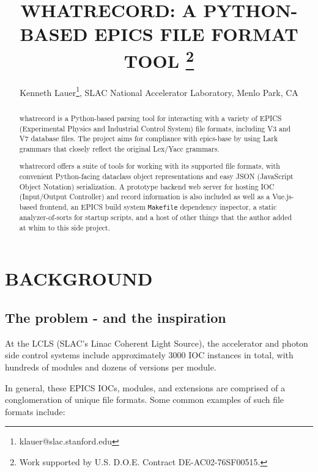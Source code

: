 \documentclass[letter,
               keeplastbox,   %
               ]{jacow}
\begin{document}
\title{WHATRECORD: A PYTHON-BASED EPICS FILE FORMAT TOOL
\thanks{Work supported by U.S. D.O.E. Contract DE-AC02-76SF00515.}}
\author{Kenneth Lauer\thanks{klauer@slac.stanford.edu}, SLAC National Accelerator Laboratory, Menlo Park, CA }
	
\maketitle

%
\begin{abstract}
  whatrecord\cite{whatrecord-github} is a Python-based parsing tool for
  interacting with a variety of EPICS (Experimental Physics and Industrial
  Control System) file formats, including V3 and V7 database files. The project
  aims for compliance with epics-base by using Lark\cite{lark} grammars that
  closely reflect the original Lex/Yacc grammars. 

  whatrecord offers a suite of tools for working with its supported file
  formats, with convenient Python-facing dataclass object representations and
  easy JSON (JavaScript Object Notation) serialization. A prototype backend web
  server for hosting IOC (Input/Output Controller) and record information is
  also included as well as a Vue.js-based frontend, an EPICS build system
  \verb_Makefile_ dependency inspector, a static analyzer-of-sorts for startup
  scripts, and a host of other things that the author added at whim to this
  side project.
\end{abstract}

\section{BACKGROUND}

\subsection{The problem - and the inspiration}

At the LCLS (SLAC's Linac Coherent Light Source), the accelerator and photon
side control systems include approximately 3000 IOC instances in total, with
hundreds of modules and dozens of versions per module.

In general, these EPICS IOCs, modules, and extensions are comprised of a
conglomeration of unique file formats. Some common examples of such file
formats include:
\end{document}
